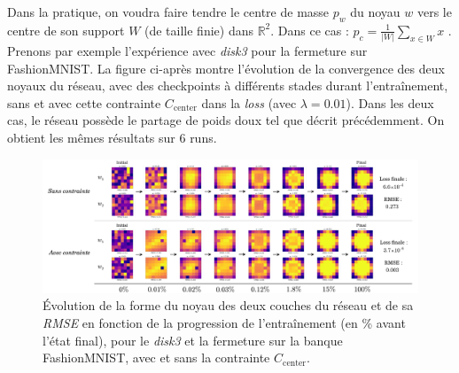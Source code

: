 \vspace{6.4mm}
Dans la pratique, on voudra faire tendre le centre de masse $p_w$ du noyau $w$ vers le centre de son support $W$ (de taille finie) dans $\mathbb{R}^2$. Dans ce cas : $p_c = \frac{1}{|W|} \sum_{x \in W} x$ . \\

\noindent Prenons par exemple l'expérience avec \textit{disk3} pour la fermeture sur FashionMNIST. La figure ci-après montre l'évolution de la convergence des deux noyaux du réseau, avec des checkpoints à différents stades durant l'entraînement, sans et avec cette contrainte $C_\text{center}$ dans la \textit{loss} (avec $\lambda = 0.01$). Dans les deux cas, le réseau possède le partage de poids doux tel que décrit précédemment. On obtient les mêmes résultats sur 6 runs. \\


\vspace{0.6mm}
\begin{figure}[htp]
  \begin{center}
    \includegraphics[width=1.00\linewidth]{parts/3-contributions/C-contraintes_geometriques/figures/k_center.pdf}
    \vspace{-4.0mm}
    \caption{ \centering Évolution de la forme du noyau des deux couches du réseau et de sa \textit{RMSE} en fonction de la progression de l'entraînement (en \% avant l'état final), pour le \textit{disk3} et la fermeture sur la banque FashionMNIST, avec et sans la contrainte $C_\text{center}$.}
    \label{fig:c_center}
  \end{center}
\end{figure}

